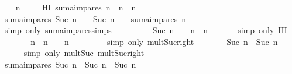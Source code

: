 \begin{isabellebody}
\isanewline
\ \ \isamarkupfalse%
\ n\ \isanewline
\ \ \isamarkupfalse%
\ HI{\isacharcolon}\ {\isachardoublequoteopen}suma{\isacharunderscore}impares\ n\ {\isacharequal}\ n\ {\isacharasterisk}\ n{\isachardoublequoteclose}\isanewline
\ \ \isamarkupfalse%
\ {\isachardoublequoteopen}suma{\isacharunderscore}impares\ {\isacharparenleft}Suc\ n{\isacharparenright}\ {\isacharequal}\ {\isacharparenleft}{}\ {\isacharasterisk}\ {\isacharparenleft}Suc\ n{\isacharparenright}\ {\isacharminus}\ {}{\isacharparenright}\ {\isacharplus}\ suma{\isacharunderscore}impares\ n{\isachardoublequoteclose}\ \isanewline
\ \ \ \ \isamarkupfalse%
\ {\isacharparenleft}simp\ only{\isacharcolon}\ suma{\isacharunderscore}impares{\isachardot}simps{\isacharparenleft}{}{\isacharparenright}{\isacharparenright}\isanewline
\ \ \isamarkupfalse%
\ \isamarkupfalse%
\ {\isachardoublequoteopen}{\isasymdots}\ {\isacharequal}\ {\isacharparenleft}{}\ {\isacharasterisk}\ {\isacharparenleft}Suc\ n{\isacharparenright}\ {\isacharminus}\ {}{\isacharparenright}\ {\isacharplus}\ n\ {\isacharasterisk}\ n{\isachardoublequoteclose}\ \isanewline
\ \ \ \ \isamarkupfalse%
\ {\isacharparenleft}simp\ only{\isacharcolon}\ HI{\isacharparenright}\isanewline
\ \ \isamarkupfalse%
\ \isamarkupfalse%
\ {\isachardoublequoteopen}{\isasymdots}\ {\isacharequal}\ n\ {\isacharasterisk}\ n\ {\isacharplus}\ {}\ {\isacharasterisk}\ n\ {\isacharplus}\ {}{\isachardoublequoteclose}\ \isanewline
\ \ \ \ \isamarkupfalse%
\ {\isacharparenleft}simp\ only{\isacharcolon}\ mult{\isacharunderscore}Suc{\isacharunderscore}right{\isacharparenright}\isanewline
\ \ \isamarkupfalse%
\ \isamarkupfalse%
\ {\isachardoublequoteopen}{\isasymdots}\ {\isacharequal}\ {\isacharparenleft}Suc\ n{\isacharparenright}\ {\isacharasterisk}\ {\isacharparenleft}Suc\ n{\isacharparenright}{\isachardoublequoteclose}\isanewline
\ \ \ \ \isamarkupfalse%
\ {\isacharparenleft}simp\ only{\isacharcolon}\ mult{\isacharunderscore}Suc\ mult{\isacharunderscore}Suc{\isacharunderscore}right{\isacharparenright}\isanewline
\ \ \isamarkupfalse%
\ \isamarkupfalse%
\ {\isachardoublequoteopen}suma{\isacharunderscore}impares\ {\isacharparenleft}Suc\ n{\isacharparenright}\ {\isacharequal}\ {\isacharparenleft}Suc\ n{\isacharparenright}\ {\isacharasterisk}\ {\isacharparenleft}Suc\ n{\isacharparenright}{\isachardoublequoteclose}\ \isanewline

\end{isabellebody}
